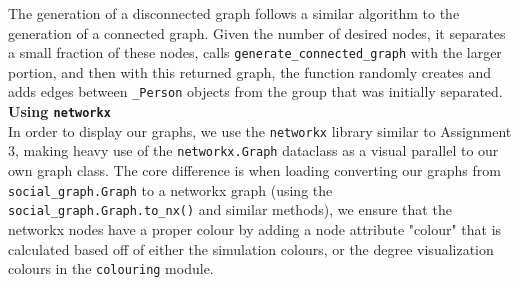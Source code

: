 \documentclass[fontsize=11pt]{article}
\newcommand{\ttt}[1]{\texttt{#1}}
\begin{document}
\newline
The generation of a disconnected graph follows a similar algorithm to the generation of a connected graph. Given the number of desired nodes, it separates a small fraction of these nodes, calls \ttt{generate\_connected\_graph} with the larger portion, and then with this returned graph, the function randomly creates and adds edges between \ttt{\_Person} objects from the group that was initially separated.\\
\newline
\noindent
\textbf{Using \ttt{networkx}} \\
In order to display our graphs, we use the \ttt{networkx} library similar to Assignment 3, making heavy use of the \ttt{networkx.Graph} dataclass as a visual parallel to our own graph class. The core difference is when loading converting our graphs from \ttt{social\_graph.Graph} to a networkx graph (using the \ttt{social\_graph.Graph.to\_nx()} and similar methods), we ensure that the networkx nodes have a proper colour by adding a node attribute "colour" that is calculated based off of either the simulation colours, or the degree visualization colours in the \ttt{colouring} module.
\newpage
\end{document}
